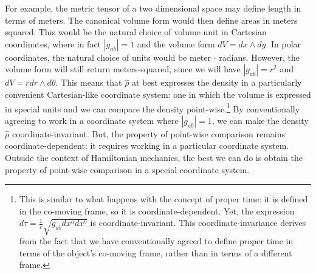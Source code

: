 \documentclass[letterpaper]{article}
\begin{document}
For example, the metric tensor of a two dimensional space may define length in terms of meters. The canonical volume form would then define areas in meters squared. This would be the natural choice of volume unit in Cartesian coordinates, where in fact $|g_{ab}| = 1$ and the volume form $dV = dx \wedge dy$. In polar coordinates, the natural choice of units would be meter $\cdot$ radians. However, the volume form will still return meters-squared, since we will have $|g_{ab}| = r^2$ and $dV = r dr \wedge d\theta$. This means that $\hat{\rho}$ at best expresses the density in a particularly convenient Cartesian-like coordinate system: one in which the volume is expressed in special units and we can compare the density point-wise.\footnote{This is similar to what happens with the concept of proper time: it is defined in the co-moving frame, so it is coordinate-dependent. Yet, the expression $d\tau = \frac{1}{c} \sqrt{g_{ab} dx^a dx^b}$ is coordinate-invariant. This coordinate-invariance derives from the fact that we have conventionally agreed to define proper time in terms of the object's co-moving frame, rather than in terms of a different frame.} By conventionally agreeing to work in a coordinate system where $|g_{ab}| = 1$, we can make the density $\hat{\rho}$ coordinate-invariant. But, the property of point-wise comparison remains coordinate-dependent: it requires working in a particular coordinate system. Outside the context of Hamiltonian mechanics, the best we can do is obtain the property of point-wise comparison in a special coordinate system.

\end{document}
